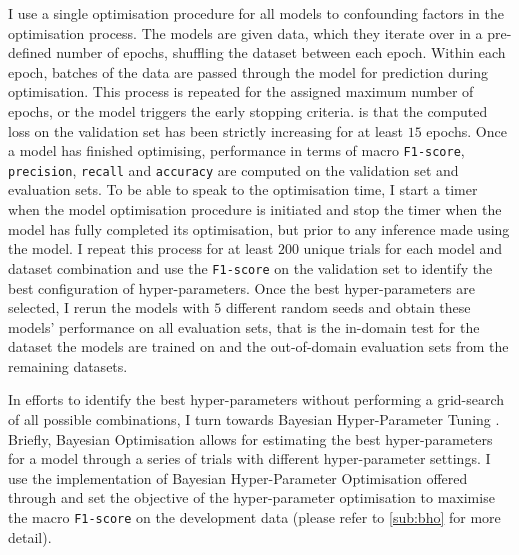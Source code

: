 I use a single optimisation procedure for all models to  confounding factors in the optimisation process.
The models are given data, which they iterate over in a pre-defined number of epochs, shuffling the dataset between each epoch.
Within each epoch, batches of the data  are passed through the model for prediction during optimisation.
This process is repeated for the assigned maximum number of epochs, or  the model triggers the early stopping \citep{Prechelt:1998} criteria. 
 is that the computed loss on the validation set has been strictly increasing for at least $15$ epochs.
Once a model has finished optimising, performance in terms of macro \texttt{F1-score}, \texttt{precision}, \texttt{recall} and \texttt{accuracy} are computed on the validation set and evaluation sets.
To be able to speak to the optimisation time, I start a timer when the model optimisation procedure is initiated and stop the timer when the model has fully completed its optimisation, but prior to any inference made using the model.
I repeat this process for at least $200$ unique trials for each model and dataset combination and use the \texttt{F1-score} on the validation set to identify the best configuration of hyper-parameters.
Once the best hyper-parameters are selected, I rerun the models with $5$ different random seeds and obtain these models' performance on all evaluation sets, that is the in-domain test for the dataset the models are trained on and the out-of-domain evaluation sets from the remaining datasets.

In efforts to identify the best hyper-parameters without performing a grid-search of all possible combinations, I turn towards Bayesian Hyper-Parameter Tuning \citep{Neal:1996}.
Briefly, Bayesian Optimisation allows for estimating the best hyper-parameters for a model through a series of trials with different hyper-parameter settings.
I use the implementation of Bayesian Hyper-Parameter Optimisation offered through \citet{Wandb} and set the objective of the hyper-parameter optimisation to maximise the macro \texttt{F1-score} on the development data (please refer to \cref{sub:bho} for more detail).

